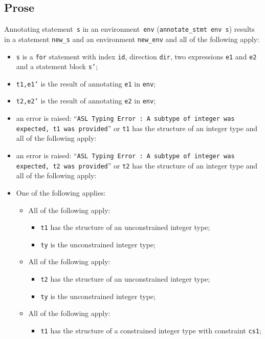 \documentclass{book}
\begin{document}
\begin{itemize}
  \subsection{Prose}
Annotating statement~\texttt{s} in an environment~\texttt{env}
(\texttt{annotate\_stmt env s}) results in a statement \texttt{new\_s} and an
environment \texttt{new\_env} and all of the following apply:
   \begin{itemize}
   \item \texttt{s} is a \texttt{for} statement with index \texttt{id}, direction \texttt{dir}, two expressions
      \texttt{e1} and \texttt{e2} and a statement block \texttt{s'};
   \item \texttt{t1,e1'} is the result of annotating \texttt{e1} in \texttt{env};
   \item \texttt{t2,e2'} is the result of annotating \texttt{e2} in \texttt{env};
   \item an error is raised: ``\texttt{ASL Typing Error : A subtype of integer was expected, t1 was provided}'' or \texttt{t1} has the structure of an integer type and all of the following apply:
   \item an error is raised: ``\texttt{ASL Typing Error : A subtype of integer was expected, t2 was provided}'' or \texttt{t2} has the structure of an integer type and all of the following apply:
   \item One of the following applies:
     \begin{itemize}
       \item All of the following apply:
         \begin{itemize}
           \item \texttt{t1} has the structure of an unconstrained integer type;
           \item \texttt{ty} is the unconstrained integer type;
         \end{itemize}
       \item All of the following apply:
         \begin{itemize}
           \item \texttt{t2} has the structure of an unconstrained integer type;
           \item \texttt{ty} is the unconstrained integer type;
         \end{itemize}
       \item All of the following apply:
         \begin{itemize}
           \item \texttt{t1} has the structure of a constrained integer type with constraint \texttt{cs1};

\end{itemize}
\end{itemize}
\end{itemize}
\end{itemize}
\end{document}
